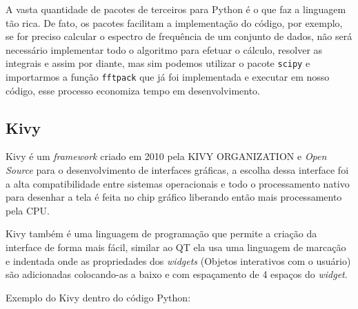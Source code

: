             A vasta quantidade de pacotes de terceiros para Python é o que faz a linguagem tão rica.
            De fato, os 
            pacotes facilitam a implementação do código, por exemplo, se for preciso calcular o espectro de 
            frequência de um conjunto de dados, não será necessário implementar todo o algoritmo para efetuar o cálculo, resolver as integrais e assim por diante, mas sim podemos utilizar o pacote \verb|scipy| e importarmos a função \verb|fftpack| que já foi implementada e executar em nosso código, esse processo economiza tempo em desenvolvimento.           
            
            \subsection{Kivy}
            
            
            \label{lim_kivy}
            Kivy é um \textit{framework} criado em 2010 pela KIVY ORGANIZATION \cite{kivy} e \textit{Open Source} para o desenvolvimento de interfaces gráficas, a escolha dessa interface foi a alta compatibilidade entre sistemas operacionais e todo o processamento nativo para desenhar a tela é feita no chip gráfico liberando então mais processamento pela CPU.
            
            Kivy também é uma linguagem de programação que permite a criação da interface de forma mais fácil, similar ao QT \cite{qt} ela usa uma linguagem de marcação e indentada onde as propriedades dos \textit{widgets} (Objetos interativos com o usuário) são adicionadas colocando-as a baixo e com espaçamento de 4 espaços do \textit{widget}. 
                        
            Exemplo do Kivy dentro do código Python:
            \begin{quote}
                                                                                 
            \end{quote}
            
